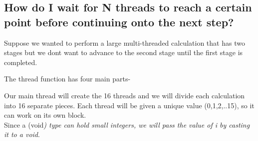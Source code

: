 \subsection{How do I wait for N threads to reach a certain point before
continuing onto the next
step?}\label{how-do-i-wait-for-n-threads-to-reach-a-certain-point-before-continuing-onto-the-next-step}

Suppose we wanted to perform a large multi-threaded calculation that has
two stages but we dont want to advance to the second stage until the
first stage is completed.

\begin{Shaded}
\begin{Highlighting}[]
 \NormalTok{data[}\NormalTok{][}\NormalTok{]}

  

  

  
\end{Highlighting}
\end{Shaded}

The thread function has four main parts-

\begin{Shaded}
\begin{Highlighting}[]
  
\NormalTok{\}}
\end{Highlighting}
\end{Shaded}

Our main thread will create the 16 threads and we will divide each
calculation into 16 separate pieces. Each thread will be given a unique
value (0,1,2,..15), so it can work on its own block.\\Since a
(void\emph{) type can hold small integers, we will pass the value of i
by casting it to a void}.

\begin{Shaded}
\begin{Highlighting}[]
 \NormalTok{data[}\NormalTok{][}\NormalTok{] ;}
 
    \NormalTok{(} 
         
\end{Highlighting}
\end{Shaded}

